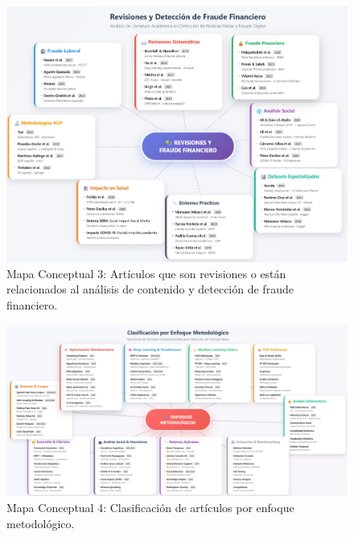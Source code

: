 \begin{figure}[h!]
    \centering
    \includegraphics[width=\textwidth]{Imagenes/mapaConceptual3.png}
    \caption{Mapa Conceptual 3: Artículos que son revisiones o están relacionados al análisis de contenido y detección de fraude financiero.}
    \label{fig:mapa_conceptual_3}
\end{figure}

\begin{figure}[h!]
    \centering
    \includegraphics[width=\textwidth]{Imagenes/mapaConceptual4.png}
    \caption{Mapa Conceptual 4: Clasificación de artículos por enfoque metodológico.}
    \label{fig:mapa_conceptual_4}
\end{figure}

